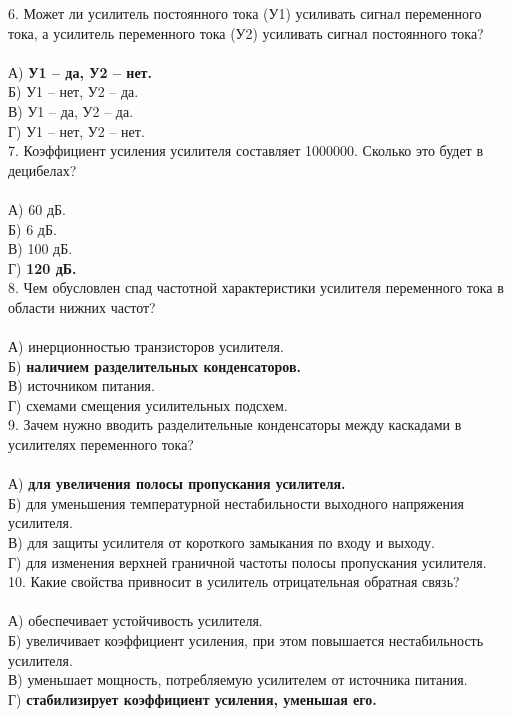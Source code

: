 6. Может ли усилитель постоянного тока (У1) усиливать сигнал переменного тока, а усилитель переменного тока (У2) усиливать сигнал постоянного тока?\\\\
А) \textbf{У1 – да, У2 – нет.}\\
Б) У1 – нет, У2 – да.\\
В) У1 – да, У2 – да.\\
Г) У1 – нет, У2 – нет.\\

7. Коэффициент усиления усилителя составляет 1000000. Сколько это будет в децибелах?\\\\
А) 60 дБ.\\
Б) 6 дБ.\\
В) 100 дБ.\\
Г) \textbf{120 дБ.}\\

8. Чем обусловлен спад частотной характеристики усилителя переменного тока в области нижних частот?\\\\
А) инерционностью транзисторов усилителя. \\
Б) \textbf{наличием разделительных конденсаторов.}\\
В) источником питания.\\
Г) схемами смещения усилительных подсхем.\\

9. Зачем нужно вводить разделительные конденсаторы между каскадами в усилителях переменного тока?\\\\
А) \textbf{для увеличения полосы пропускания усилителя.}\\
Б) для уменьшения температурной нестабильности выходного напряжения усилителя. \\
В) для защиты усилителя от короткого замыкания по входу и выходу.\\
Г) для изменения верхней граничной частоты полосы пропускания усилителя.\\

10. Какие свойства привносит в усилитель отрицательная обратная связь?\\\\
А) обеспечивает устойчивость усилителя.\\
Б) увеличивает коэффициент усиления, при этом повышается нестабильность усилителя.\\
В) уменьшает мощность, потребляемую усилителем от источника питания.\\
Г) \textbf{стабилизирует коэффициент усиления, уменьшая его.}\\

